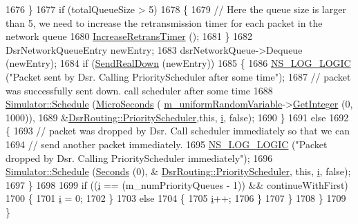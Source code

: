 \begin{DoxyCode}
1676             \}
1677           \textcolor{keywordflow}{if} (totalQueueSize > 5)
1678             \{
1679               \textcolor{comment}{// Here the queue size is larger than 5, we need to increase the retransmission timer for
       each packet in the network queue}
1680               \hyperlink{classns3_1_1dsr_1_1DsrRouting_aeb92858b27d37c4c593ef7f5be53dd09}{IncreaseRetransTimer} ();
1681             \}
1682           DsrNetworkQueueEntry newEntry;
1683           dsrNetworkQueue->Dequeue (newEntry);
1684           \textcolor{keywordflow}{if} (\hyperlink{classns3_1_1dsr_1_1DsrRouting_a1ec646804cb4db00478cc07e51998608}{SendRealDown} (newEntry))
1685             \{
1686               \hyperlink{group__logging_ga88acd260151caf2db9c0fc84997f45ce}{NS\_LOG\_LOGIC} (\textcolor{stringliteral}{"Packet sent by Dsr. Calling PriorityScheduler after some time"});
1687               \textcolor{comment}{// packet was successfully sent down. call scheduler after some time}
1688               \hyperlink{classns3_1_1Simulator_a671882c894a08af4a5e91181bf1eec13}{Simulator::Schedule} (\hyperlink{group__timecivil_ga17465a639c8d1464e76538afdd78a9f0}{MicroSeconds} (
      \hyperlink{classns3_1_1dsr_1_1DsrRouting_a22a85b3510166ffdd451e4010f996f0f}{m\_uniformRandomVariable}->\hyperlink{classns3_1_1RandomVariableStream_a66cd94e6305ce7f000f1a9ff0fcb9aef}{GetInteger} (0, 1000)),
1689                                    &\hyperlink{classns3_1_1dsr_1_1DsrRouting_aefc4dde8bd52b5b631a7ebf1d5924210}{DsrRouting::PriorityScheduler},\textcolor{keyword}{this}, 
      \hyperlink{bernuolliDistribution_8m_a6f6ccfcf58b31cb6412107d9d5281426}{i}, \textcolor{keyword}{false});
1690             \}
1691           \textcolor{keywordflow}{else}
1692             \{
1693               \textcolor{comment}{// packet was dropped by Dsr. Call scheduler immediately so that we can}
1694               \textcolor{comment}{// send another packet immediately.}
1695               \hyperlink{group__logging_ga88acd260151caf2db9c0fc84997f45ce}{NS\_LOG\_LOGIC} (\textcolor{stringliteral}{"Packet dropped by Dsr. Calling PriorityScheduler immediately"});
1696               \hyperlink{classns3_1_1Simulator_a671882c894a08af4a5e91181bf1eec13}{Simulator::Schedule} (\hyperlink{group__timecivil_ga33c34b816f8ff6628e33d5c8e9713b9e}{Seconds} (0), &
      \hyperlink{classns3_1_1dsr_1_1DsrRouting_aefc4dde8bd52b5b631a7ebf1d5924210}{DsrRouting::PriorityScheduler}, \textcolor{keyword}{this}, \hyperlink{bernuolliDistribution_8m_a6f6ccfcf58b31cb6412107d9d5281426}{i}, \textcolor{keyword}{false});
1697             \}
1698 
1699           \textcolor{keywordflow}{if} ((\hyperlink{bernuolliDistribution_8m_a6f6ccfcf58b31cb6412107d9d5281426}{i} == (m\_numPriorityQueues - 1)) && continueWithFirst)
1700             \{
1701               \hyperlink{bernuolliDistribution_8m_a6f6ccfcf58b31cb6412107d9d5281426}{i} = 0;
1702             \}
1703           \textcolor{keywordflow}{else}
1704             \{
1705               \hyperlink{bernuolliDistribution_8m_a6f6ccfcf58b31cb6412107d9d5281426}{i}++;
1706             \}
1707         \}
1708     \}
1709 \}
\end{DoxyCode}


